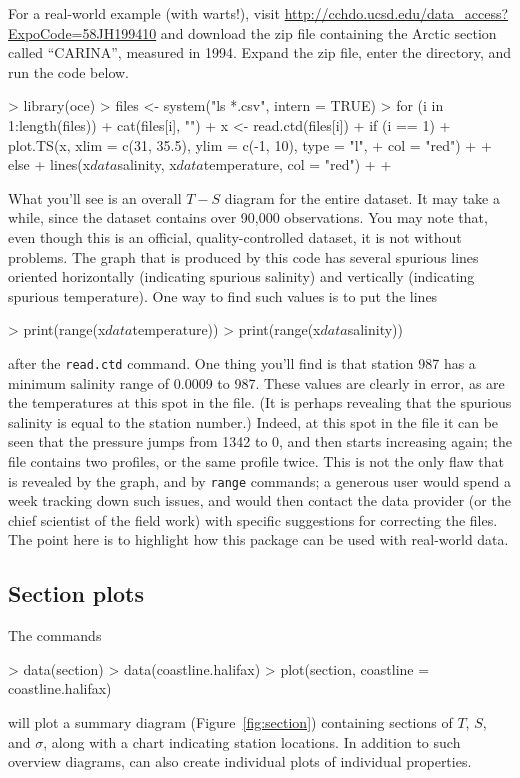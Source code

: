 \documentclass{article}
\begin{document}
For a real-world example (with warts!), visit
\url{http://cchdo.ucsd.edu/data_access?ExpoCode=58JH199410} and download the zip file containing
the Arctic section called ``CARINA'', measured in 1994. Expand the zip file, enter the directory,
and run the code below. 
\begin{Schunk}
\begin{Sinput}
> library(oce)
> files <- system("ls *.csv", intern = TRUE)
> for (i in 1:length(files)) {
+     cat(files[i], "\n")
+     x <- read.ctd(files[i])
+     if (i == 1) {
+         plot.TS(x, xlim = c(31, 35.5), ylim = c(-1, 10), type = "l", 
+             col = "red")
+     }
+     else {
+         lines(x$data$salinity, x$data$temperature, col = "red")
+     }
+ }
\end{Sinput}
\end{Schunk}

What you'll see is an overall $T-S$ diagram for the entire dataset. It may take a while, since the
dataset contains over 90,000 observations. You may note that, even though this is an official,
quality-controlled dataset, it is not without problems. The graph that is produced by this code
has several spurious lines oriented horizontally (indicating spurious salinity) and vertically
(indicating spurious temperature). One way to find such values is to put the lines
\begin{Schunk}
\begin{Sinput}
> print(range(x$data$temperature))
> print(range(x$data$salinity))
\end{Sinput}
\end{Schunk}
after the \texttt{read.ctd} command. One thing you'll find is that station 987 has a minimum
salinity range of 0.0009 to 987. These values are clearly in error, as are the temperatures at
this spot in the file. (It is perhaps revealing that the spurious salinity is equal to the
station number.) Indeed, at this spot in the file it can be seen that the pressure jumps from
1342 to 0, and then starts increasing again; the file contains two profiles, or the same profile
twice. This is not the only flaw that is revealed by the graph, and by \texttt{range} commands;
a generous user would spend a week tracking down such issues, and would then contact the data
provider (or the chief scientist of the field work) with specific suggestions for correcting the
files. The point here is to highlight how this package can be used with
real-world data.

\subsection{Section plots}
The commands
\begin{Schunk}
\begin{Sinput}
> data(section)
> data(coastline.halifax)
> plot(section, coastline = coastline.halifax)
\end{Sinput}
\end{Schunk}
will plot a summary diagram (Figure~\ref{fig:section}) containing sections of $T$, $S$, and
$\sigma$, along with a chart indicating station locations. In addition to such overview
diagrams, \verb@plot@ can also create individual plots of individual properties.
\end{document}
